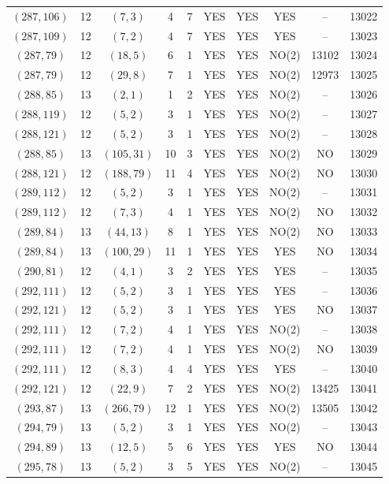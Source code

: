 \begin{longtable}{|c|c|c|c|c|c|c|c|c|c|}
$(287, 106)$ & 12 & $(7, 3)$ & 4 & 7 & YES & YES & YES & -- & 13022\\
$(287, 109)$ & 12 & $(7, 2)$ & 4 & 7 & YES & YES & YES & -- & 13023\\
$(287, 79)$ & 12 & $(18, 5)$ & 6 & 1 & YES & YES & NO(2) & 13102 & 13024\\
$(287, 79)$ & 12 & $(29, 8)$ & 7 & 1 & YES & YES & NO(2) & 12973 & 13025\\
$(288, 85)$ & 13 & $(2, 1)$ & 1 & 2 & YES & YES & NO(2) & -- & 13026\\
$(288, 119)$ & 12 & $(5, 2)$ & 3 & 1 & YES & YES & NO(2) & -- & 13027\\
$(288, 121)$ & 12 & $(5, 2)$ & 3 & 1 & YES & YES & NO(2) & -- & 13028\\
$(288, 85)$ & 13 & $(105, 31)$ & 10 & 3 & YES & YES & NO(2) & NO & 13029\\
$(288, 121)$ & 12 & $(188, 79)$ & 11 & 4 & YES & YES & NO(2) & NO & 13030\\
$(289, 112)$ & 12 & $(5, 2)$ & 3 & 1 & YES & YES & NO(2) & -- & 13031\\
$(289, 112)$ & 12 & $(7, 3)$ & 4 & 1 & YES & YES & NO(2) & NO & 13032\\
$(289, 84)$ & 13 & $(44, 13)$ & 8 & 1 & YES & YES & NO(2) & NO & 13033\\
$(289, 84)$ & 13 & $(100, 29)$ & 11 & 1 & YES & YES & YES & NO & 13034\\
$(290, 81)$ & 12 & $(4, 1)$ & 3 & 2 & YES & YES & YES & -- & 13035\\
$(292, 111)$ & 12 & $(5, 2)$ & 3 & 1 & YES & YES & YES & -- & 13036\\
$(292, 121)$ & 12 & $(5, 2)$ & 3 & 1 & YES & YES & YES & NO & 13037\\
$(292, 111)$ & 12 & $(7, 2)$ & 4 & 1 & YES & YES & NO(2) & -- & 13038\\
$(292, 111)$ & 12 & $(7, 2)$ & 4 & 1 & YES & YES & NO(2) & NO & 13039\\
$(292, 111)$ & 12 & $(8, 3)$ & 4 & 4 & YES & YES & YES & -- & 13040\\
$(292, 121)$ & 12 & $(22, 9)$ & 7 & 2 & YES & YES & NO(2) & 13425 & 13041\\
$(293, 87)$ & 13 & $(266, 79)$ & 12 & 1 & YES & YES & NO(2) & 13505 & 13042\\
$(294, 79)$ & 13 & $(5, 2)$ & 3 & 1 & YES & YES & NO(2) & -- & 13043\\
$(294, 89)$ & 13 & $(12, 5)$ & 5 & 6 & YES & YES & YES & NO & 13044\\
$(295, 78)$ & 13 & $(5, 2)$ & 3 & 5 & YES & YES & NO(2) & -- & 13045\\

\end{longtable}
